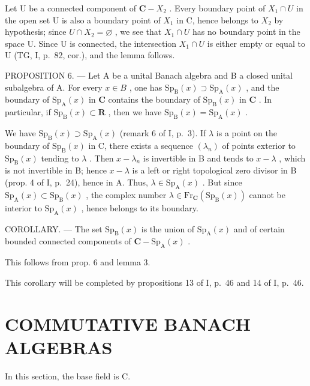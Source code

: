 Let U be a connected component of \(\mathbf{C}-X_{2}\) . Every boundary point of \(X_{1} \cap U\) in the open set U is also a boundary point of \(X_{1}\) in C, hence belongs to \(X_{2}\) by hypothesis; since \(U \cap X_{2} = \varnothing\) , we see that \(X_{1} \cap U\) has no boundary point in the space U. Since U is connected, the intersection \(X_{1} \cap U\) is either empty or equal to U (TG, I, p.~82, cor.), and the lemma follows.

PROPOSITION 6. — Let A be a unital Banach algebra and B a closed unital subalgebra of A. For every \(x \in B\) , one has \(\mathrm{Sp}_{\mathrm{B}}(x) \supset \mathrm{Sp}_{\mathrm{A}}(x)\) , and the boundary of \(\mathrm{Sp}_{\mathrm{A}}(x)\) in \(\mathbf{C}\) contains the boundary of \(\mathrm{Sp}_{\mathrm{B}}(x)\) in \(\mathbf{C}\) . In particular, if \(\mathrm{Sp}_{\mathrm{B}}(x) \subset \mathbf{R}\) , then we have \(\mathrm{Sp}_{\mathrm{B}}(x) = \mathrm{Sp}_{\mathrm{A}}(x)\) .

We have \(\mathrm{Sp}_{\mathrm{B}}(x) \supset \mathrm{Sp}_{\mathrm{A}}(x)\) (remark 6 of I, p.~3). If \(\lambda\) is a point on the boundary of \(\mathrm{Sp}_{\mathrm{B}}(x)\) in C, there exists a sequence \((\lambda_{n})\) of points exterior to \(\mathrm{Sp}_{\mathrm{B}}(x)\) tending to \(\lambda\) . Then \(x - \lambda_{n}\) is invertible in B and tends to \(x - \lambda\) , which is not invertible in B; hence \(x - \lambda\) is a left or right topological zero divisor in B (prop. 4 of I, p.~24), hence in A. Thus, \(\lambda \in \mathrm{Sp}_{\mathrm{A}}(x)\) . But since \(\mathrm{Sp}_{\mathrm{A}}(x) \subset \mathrm{Sp}_{\mathrm{B}}(x)\) , the complex number \(\lambda \in \mathrm{Fr}_{\mathbf{C}}(\mathrm{Sp}_{\mathrm{B}}(x))\) cannot be interior to \(\mathrm{Sp}_{\mathrm{A}}(x)\) , hence belongs to its boundary.

COROLLARY. --- The set \(\mathrm{Sp}_{\mathrm{B}}(x)\) is the union of \(\mathrm{Sp}_{\mathrm{A}}(x)\) and of certain bounded connected components of \(\mathbf{C}-\mathrm{Sp}_{\mathrm{A}}(x)\) .

This follows from prop. 6 and lemma 3.

This corollary will be completed by propositions 13 of I, p.~46 and 14 of I, p.~46.

\section{COMMUTATIVE BANACH ALGEBRAS}

In this section, the base field is C.

